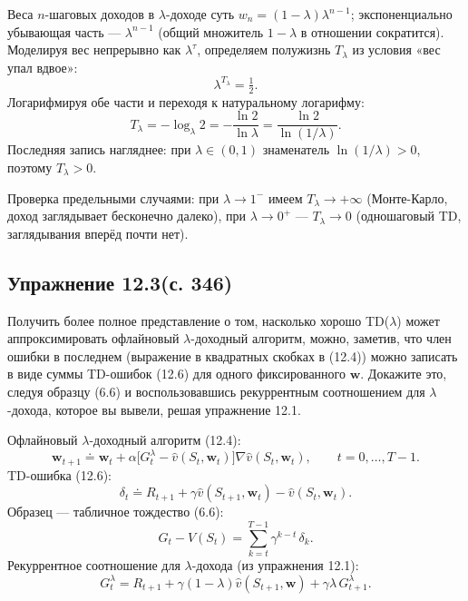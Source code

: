 \begin{solution}
    Веса $n$-шаговых доходов в $\lambda$-доходе суть $w_n=(1-\lambda)\lambda^{n-1}$;
    экспоненциально убывающая часть --- $\lambda^{n-1}$ (общий множитель $1-\lambda$
    в отношении сократится). Моделируя вес непрерывно как $\lambda^{\tau}$,
    определяем полужизнь $T_\lambda$ из условия «вес упал вдвое»:
    \begin{equation*}
        \lambda^{T_\lambda} = \tfrac12.
    \end{equation*}
    Логарифмируя обе части и переходя к натуральному логарифму:
    \begin{equation*}
        T_\lambda = -\log_\lambda 2 = -\frac{\ln 2}{\ln\lambda} = \frac{\ln 2}{\ln(1/\lambda)}.
    \end{equation*}
    Последняя запись нагляднее: при $\lambda\in(0,1)$ знаменатель $\ln(1/\lambda)>0$,
    поэтому $T_\lambda>0$.

    Проверка предельными случаями: при $\lambda\to 1^-$ имеем $T_\lambda\to+\infty$
    (Монте-Карло, доход заглядывает бесконечно далеко), при $\lambda\to 0^+$ ---
    $T_\lambda\to 0$ (одношаговый TD, заглядывания вперёд почти нет).
\end{solution}

\subsection{Упражнение 12.3(с. 346)}
Получить более полное представление о том, насколько хорошо TD($\lambda$) может
аппроксимировать офлайновый $\lambda$-доходный алгоритм, можно, заметив, что член
ошибки в последнем (выражение в квадратных скобках в (12.4)) можно записать в
виде суммы TD-ошибок (12.6) для одного фиксированного $\mathbf w$. Докажите это,
следуя образцу (6.6) и воспользовавшись рекуррентным соотношением для
$\lambda$-дохода, которое вы вывели, решая упражнение 12.1.

Офлайновый $\lambda$-доходный алгоритм (12.4):
\begin{equation}
    \mathbf w_{t+1} \doteq \mathbf w_t + \alpha\big[G_t^\lambda - \hat v(S_t,\mathbf w_t)\big]\nabla\hat v(S_t,\mathbf w_t),
    \qquad t = 0,\dots,T-1.
    \tag{12.4}
\end{equation}
TD-ошибка (12.6):
\begin{equation}
    \delta_t \doteq R_{t+1} + \gamma\hat v(S_{t+1},\mathbf w_t) - \hat v(S_t,\mathbf w_t).
    \tag{12.6}
\end{equation}
Образец --- табличное тождество (6.6):
\begin{equation}
    G_t - V(S_t) = \sum_{k=t}^{T-1} \gamma^{k-t}\,\delta_k.
    \tag{6.6}
\end{equation}
Рекуррентное соотношение для $\lambda$-дохода (из упражнения 12.1):
\begin{equation*}
    G_t^\lambda = R_{t+1} + \gamma(1-\lambda)\hat v(S_{t+1},\mathbf w) + \gamma\lambda\,G_{t+1}^\lambda.
\end{equation*}


